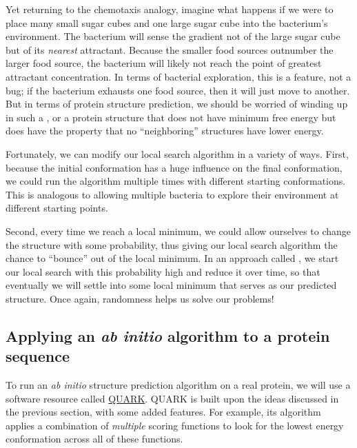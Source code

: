 Yet returning to the chemotaxis analogy, imagine what happens if we were to place many small sugar cubes and one large sugar cube into the bacterium's environment. The bacterium will sense the gradient not of the large sugar cube but of its \textit{nearest} attractant. Because the smaller food sources outnumber the larger food source, the bacterium will likely not reach the point of greatest attractant concentration. In terms of bacterial exploration, this is a feature, not a bug; if the bacterium exhausts one food source, then it will just move to another. But in terms of protein structure prediction, we should be worried of winding up in such a , or a protein structure that does not have minimum free energy but does have  the property that no ``neighboring'' structures have lower energy.\\

\begin{qbox}\end{qbox}

Fortunately, we can modify our local search algorithm in a variety of ways. First, because the initial conformation has a huge influence on the final conformation, we could run the algorithm multiple times with different starting conformations. This is analogous to allowing multiple bacteria to explore their environment at different starting points.

Second, every time we reach a local minimum, we could allow ourselves to change the structure with some probability, thus giving our local search algorithm the chance to ``bounce'' out of the local minimum. In an approach called , we start our local search with this probability high and reduce it over time, so that eventually we will settle into some local minimum that serves as our predicted structure. Once again, randomness helps us solve our problems!

\FloatBarrier
{}
\subsection{Applying an \textit{ab initio} algorithm to a protein sequence}

To run an \textit{ab initio} structure prediction algorithm on a real protein, we will use a software resource called \href{https://zhanglab.ccmb.med.umich.edu/QUARK/}{QUARK}. QUARK is built upon the ideas discussed in the previous section, with some added features. For example, its algorithm applies a combination of \textit{multiple} scoring functions to look for the lowest energy conformation across all of these functions.

